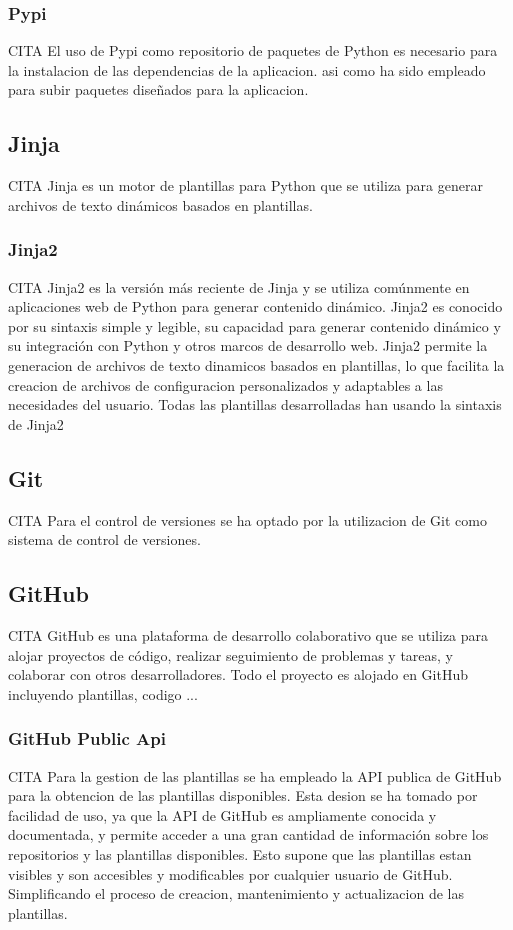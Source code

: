 \documentclass[12pt, a4paper, twoside]{article}
\begin{document}
\subsubsection{Pypi}
CITA
El uso de Pypi como repositorio de paquetes de Python es necesario para la instalacion de las dependencias de la aplicacion.
asi como ha sido empleado para subir paquetes diseñados para la aplicacion.

\subsection{Jinja}
CITA
Jinja es un motor de plantillas para Python que se utiliza para generar archivos de texto dinámicos basados en plantillas. 

\subsubsection{Jinja2}
CITA
Jinja2 es la versión más reciente de Jinja y se utiliza comúnmente en aplicaciones web de Python para generar contenido dinámico.
Jinja2 es conocido por su sintaxis simple y legible, su capacidad para generar contenido dinámico y su integración con Python y otros marcos de desarrollo web.
Jinja2 permite la generacion de archivos de texto dinamicos basados en plantillas, lo que facilita la creacion de archivos de configuracion personalizados y adaptables a las necesidades del usuario.
Todas las plantillas desarrolladas han usando la sintaxis de Jinja2



\subsection{Git}
CITA 
Para el control de versiones se ha optado por la utilizacion de Git como sistema de control de versiones.
\subsection{GitHub}
CITA 
GitHub es una plataforma de desarrollo colaborativo que se utiliza para alojar proyectos de código, realizar seguimiento de problemas y tareas, y colaborar con otros desarrolladores.
Todo el proyecto es alojado en GitHub incluyendo plantillas, codigo ...
\subsubsection{GitHub Public Api}
CITA
Para la gestion de las plantillas se ha empleado la API publica de GitHub para la obtencion de las plantillas disponibles.
Esta desion se ha tomado por facilidad de uso, ya que la API de GitHub es ampliamente conocida y documentada, y permite acceder a una gran cantidad de información sobre los repositorios y las plantillas disponibles.
Esto supone que las plantillas estan visibles y son accesibles y modificables por cualquier usuario de GitHub.
Simplificando el proceso de creacion, mantenimiento y actualizacion de las plantillas. 
\blindtext
\end{document}

